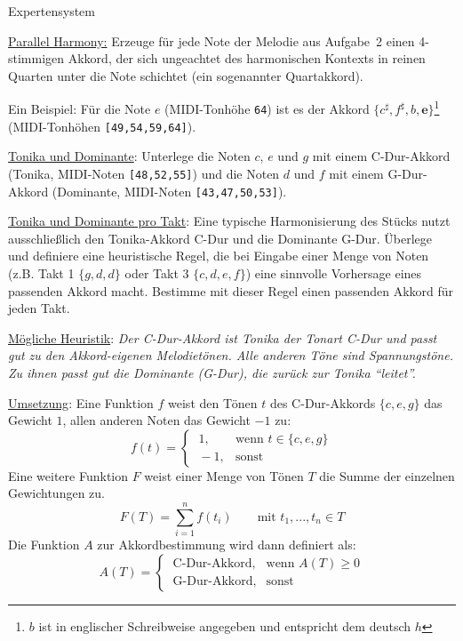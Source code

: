 \documentclass{uebungsblatt}
\begin{document}
\begin{aufgabe}{Expertensystem}
	\begin{teilaufgabe}
		\underline{Parallel Harmony:} Erzeuge für jede Note der Melodie aus Aufgabe~2 einen 4-stimmigen Akkord, der sich ungeachtet des harmonischen Kontexts in reinen Quarten unter die Note schichtet (ein sogenannter Quartakkord).
		\begin{tipp}
			Ein Beispiel: Für die Note $e$ (MIDI-Tonhöhe \texttt{64}) ist es der Akkord $\{c^\sharp,f^\sharp,b,\textbf{e}\}$\footnote{$b$ ist in englischer Schreibweise angegeben und entspricht dem deutsch $h$} (MIDI-Tonhöhen \texttt{[49,54,59,64]}).
		\end{tipp}
	\end{teilaufgabe}
	\begin{teilaufgabe}
		\underline{Tonika und Dominante}: Unterlege die Noten $c$, $e$ und $g$ mit einem C-Dur-Akkord (Tonika, MIDI-Noten \texttt{[48,52,55]}) und die Noten $d$ und $f$ mit einem G-Dur-Akkord (Dominante, MIDI-Noten \texttt{[43,47,50,53]}).
	\end{teilaufgabe}
	\begin{teilaufgabe}
		\underline{Tonika und Dominante pro Takt}: Eine typische Harmonisierung des Stücks nutzt ausschließlich den Tonika-Akkord C-Dur und die Dominante G-Dur. Überlege und definiere eine heuristische Regel, die bei Eingabe einer Menge von Noten (z.B. Takt 1 $\{g,d,d\}$ oder Takt 3 $\{c,d,e,f\}$) eine sinnvolle Vorhersage eines passenden Akkord macht. Bestimme mit dieser Regel einen passenden Akkord für jeden Takt.
	\end{teilaufgabe}
	\begin{loesung}
		\underline{Mögliche Heuristik}: \emph{Der C-Dur-Akkord ist Tonika der Tonart C-Dur und passt gut zu den Akkord-eigenen Melodietönen. Alle anderen Töne sind Spannungstöne. Zu ihnen passt gut die Dominante (G-Dur), die zurück zur Tonika \enquote{leitet}.}
		
		\medskip
		\underline{Umsetzung}:
		Eine Funktion $f$ weist den Tönen $t$ des C-Dur-Akkords $\{c,e,g\}$ das Gewicht $1$, allen anderen Noten das Gewicht $-1$ zu:
		\[
			f(t) = 
			\begin{cases}
				~1, & \text{wenn } t \in \{c,e,g\}\\
				~-1, & \text{sonst} 
			\end{cases}
		\]
		Eine weitere Funktion $F$ weist einer Menge von Tönen $T$ die Summe der einzelnen Gewichtungen zu.
		\[
			F(T) = \sum_{i=1}^n f(t_i) \qquad \text{mit } t_1, ..., t_n \in T
		\]
		Die Funktion $A$ zur Akkordbestimmung wird dann definiert als:
		\[
			A(T) = 
			\begin{cases}
				~\text{C-Dur-Akkord}, & \text{wenn } A(T) \geq 0\\
				~\text{G-Dur-Akkord}, & \text{sonst} 
			\end{cases}
		\]
		

\end{loesung}
\end{aufgabe}
\end{document}
